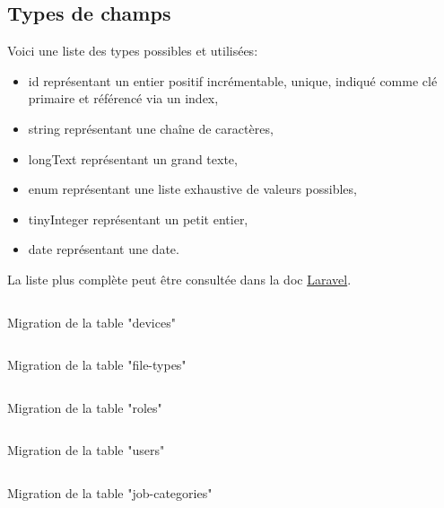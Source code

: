 \documentclass[
    iai, %
    il, %
]{heig-tb}
\begin{document}
\subsection{Types de champs}
Voici une liste des types possibles et utilisées:
\begin{itemize}
    \item id représentant un entier positif incrémentable, unique, indiqué comme clé primaire et référencé via un index,
    \item string représentant une chaîne de caractères,
    \item longText représentant un grand texte,
    \item enum représentant une liste exhaustive de valeurs possibles,
    \item tinyInteger représentant un petit entier,
    \item date représentant une date.
\end{itemize}

La liste plus complète peut être consultée dans la doc \href{https://laravel.com/docs/9.x/migrations#available-column-types}{Laravel}.

\begin{listing}[h]
    \inputminted{php}{assets/code/11_create_devices_table.php}
    \caption{Migration de la table "devices" \label{migrations-devices}}
\end{listing}

\begin{listing}[h]
    \inputminted{php}{assets/code/12_create_file_types_table.php}
    \caption{Migration de la table "file-types" \label{migrations-file-types}}
\end{listing}

\begin{listing}[h]
    \inputminted{php}{assets/code/13_create_roles_table.php}
    \caption{Migration de la table "roles" \label{migrations-roles}}
\end{listing}

\begin{listing}[h]
    \inputminted{php}{assets/code/14_create_users_table.php}
    \caption{Migration de la table "users" \label{migrations-users}}
\end{listing}

\begin{listing}[h]
    \inputminted{php}{assets/code/15_create_job_categories_table.php}
    \caption{Migration de la table "job-categories" \label{migrations-job-categories}}
\end{listing}
\end{document}
